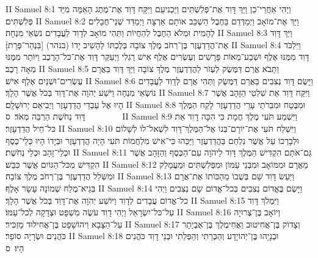 II Samuel 8:1	וַיְהִי אַחֲרֵי־כֵן וַיַּךְ דָּוִד אֶת־פְּלִשְׁתִּים וַיַּכְנִיעֵם וַיִּקַּח דָּוִד אֶת־מֶתֶג הָאַמָּה מִיַּד פְּלִשְׁתִּים׃
II Samuel 8:2	וַיַּךְ אֶת־מוֹאָב וַיְמַדְּדֵם בַּחֶבֶל הַשְׁכֵּב אוֹתָם אַרְצָה וַיְמַדֵּד שְׁנֵי־חֲבָלִים לְהָמִית וּמְלֹא הַחֶבֶל לְהַחֲיוֹת וַתְּהִי מוֹאָב לְדָוִד לַעֲבָדִים נֹשְׂאֵי מִנְחָה׃
II Samuel 8:3	וַיַּךְ דָּוִד אֶת־הֲדַדְעֶזֶר בֶּן־רְחֹב מֶלֶךְ צוֹבָה בְּלֶכְתּוֹ לְהָשִׁיב יָדוֹ (בנהר) [בִּנְהַר־פְּרָת]׃
II Samuel 8:4	וַיִּלְכֹּד דָּוִד מִמֶּנּוּ אֶלֶף וּשְׁבַע־מֵאוֹת פָּרָשִׁים וְעֶשְׂרִים אֶלֶף אִישׁ רַגְלִי וַיְעַקֵּר דָּוִד אֶת־כּל־הָרֶכֶב וַיּוֹתֵר מִמֶּנּוּ מֵאָה רָכֶב׃
II Samuel 8:5	וַתָּבֹא אֲרַם דַּמֶּשֶׂק לַעְזֹר לַהֲדַדְעֶזֶר מֶלֶךְ צוֹבָה וַיַּךְ דָּוִד בַּאֲרָם עֶשְׂרִים־וּשְׁנַיִם אֶלֶף אִישׁ׃
II Samuel 8:6	וַיָּשֶׂם דָּוִד נְצִבִים בַּאֲרַם דַּמֶּשֶׂק וַתְּהִי אֲרָם לְדָוִד לַעֲבָדִים נוֹשְׂאֵי מִנְחָה וַיֹּשַׁע יְהֹוָה אֶת־דָּוִד בְּכֹל אֲשֶׁר הָלָךְ׃
II Samuel 8:7	וַיִּקַּח דָּוִד אֵת שִׁלְטֵי הַזָּהָב אֲשֶׁר הָיוּ אֶל עַבְדֵי הֲדַדְעָזֶר וַיְבִיאֵם יְרוּשָׁלָ͏ִם׃
II Samuel 8:8	וּמִבֶּטַח וּמִבֵּרֹתַי עָרֵי הֲדַדְעָזֶר לָקַח הַמֶּלֶךְ דָּוִד נְחֹשֶׁת הַרְבֵּה מְאֹד׃ {ס}        
II Samuel 8:9	וַיִּשְׁמַע תֹּעִי מֶלֶךְ חֲמָת כִּי הִכָּה דָוִד אֵת כּל־חֵיל הֲדַדְעָזֶר׃
II Samuel 8:10	וַיִּשְׁלַח תֹּעִי אֶת־יוֹרָם־בְּנוֹ אֶל־הַמֶּלֶךְ־דָּוִד לִשְׁאל־לוֹ לְשָׁלוֹם וּלְבָרְכוֹ עַל אֲשֶׁר נִלְחַם בַּהֲדַדְעֶזֶר וַיַּכֵּהוּ כִּי־אִישׁ מִלְחֲמוֹת תֹּעִי הָיָה הֲדַדְעָזֶר וּבְיָדוֹ הָיוּ כְּלֵי־כֶסֶף וּכְלֵי־זָהָב וּכְלֵי נְחֹשֶׁת׃
II Samuel 8:11	גַּם־אֹתָם הִקְדִּישׁ הַמֶּלֶךְ דָּוִד לַיהֹוָה עִם־הַכֶּסֶף וְהַזָּהָב אֲשֶׁר הִקְדִּישׁ מִכּל־הַגּוֹיִם אֲשֶׁר כִּבֵּשׁ׃
II Samuel 8:12	מֵאֲרָם וּמִמּוֹאָב וּמִבְּנֵי עַמּוֹן וּמִפְּלִשְׁתִּים וּמֵעֲמָלֵק וּמִשְּׁלַל הֲדַדְעֶזֶר בֶּן־רְחֹב מֶלֶךְ צוֹבָה׃
II Samuel 8:13	וַיַּעַשׂ דָּוִד שֵׁם בְּשֻׁבוֹ מֵהַכּוֹתוֹ אֶת־אֲרָם בְּגֵיא־מֶלַח שְׁמוֹנָה עָשָׂר אָלֶף׃
II Samuel 8:14	וַיָּשֶׂם בֶּאֱדוֹם נְצִבִים בְּכל־אֱדוֹם שָׂם נְצִבִים וַיְהִי כל־אֱדוֹם עֲבָדִים לְדָוִד וַיּוֹשַׁע יְהֹוָה אֶת־דָּוִד בְּכֹל אֲשֶׁר הָלָךְ׃
II Samuel 8:15	וַיִּמְלֹךְ דָּוִד עַל־כּל־יִשְׂרָאֵל וַיְהִי דָוִד עֹשֶׂה מִשְׁפָּט וּצְדָקָה לְכל־עַמּוֹ׃
II Samuel 8:16	וְיוֹאָב בֶּן־צְרוּיָה עַל־הַצָּבָא וִיהוֹשָׁפָט בֶּן־אֲחִילוּד מַזְכִּיר׃
II Samuel 8:17	וְצָדוֹק בֶּן־אֲחִיטוּב וַאֲחִימֶלֶךְ בֶּן־אֶבְיָתָר כֹּהֲנִים וּשְׂרָיָה סוֹפֵר׃
II Samuel 8:18	וּבְנָיָהוּ בֶּן־יְהוֹיָדָע וְהַכְּרֵתִי וְהַפְּלֵתִי וּבְנֵי דָוִד כֹּהֲנִים הָיוּ׃ {ס}        
